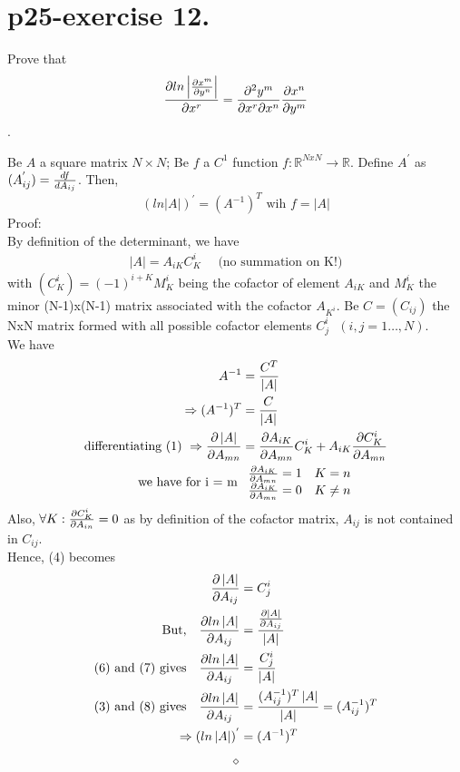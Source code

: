 \section{p25-exercise 12.}
\begin{tcolorbox}
Prove that $$\pdv{ln\left|\pdv{x^m}{y^n}\right|}{x^r} =\pdv{y^m}{x^r}{x^n}\pdv{x^n}{y^m}$$.
\end{tcolorbox}
\begin{lemma}
Be $A$ a square matrix $N\times N$; Be $f$ a $C^1$ function $f:\mathbb{R}^{NxN} \rightarrow \mathbb{R}$. Define $A^{'}$ as $(A^{'}_{ij}) = \dv{f}{A_{ij}}$. Then,$$(ln\left|A\right|)^{'} = (A^{-1})^T \text{ wih }  f =\left|A\right|$$
Proof:\\
By definition of the determinant, we have
\begin{align}
\left|A\right| = A_{iK}C_{K}^i \quad \text{ (no summation on K!)}
\end{align}
with $(C_{K}^i) =  (-1)^{i+K}M^{i}_K$ being the cofactor  of element $A_{iK}$ and $M^{i}_K$ the minor (N-1)x(N-1) matrix associated with the cofactor $A_{K^i}$. Be $C = (C_{ij})$ the NxN matrix formed with all possible cofactor elements  $C_{j}^i \text{  }(i,j = 1 \dots,N)$.\\
We have 
\begin{align}
\ A^{-1} &= \frac{C^T}{\left|A\right|}\\
\Rightarrow (A^{-1})^T &= \frac{C}{\left|A\right|} \\
\text{differentiating (1) }\Rightarrow \pdv{\left|A\right|}{A_{mn}} &= \pdv{A_{iK}}{A_{mn}}C^i_K +A_{iK} \pdv{C^i_K}{A_{mn}}\\
\text{we have for i = m } & \begin{array}{c}
    \pdv{A_{iK}}{A_{mn}} = 1\quad K=n\\
    \pdv{A_{iK}}{A_{mn}} = 0\quad K \neq n\\
  \end{array}
\end{align}
Also, $\forall K: \pdv{C^i_K}{A_{in}} = 0 $ as by definition of the cofactor matrix, $A_{ij} $ is not contained in $C_{ij} $.\\
Hence, (4) becomes
\begin{align}
\pdv{\left|A\right|}{A_{ij}} &= C^i_j\\
\text{But,}\quad \pdv{ln\left|A\right|}{A_{ij}} &= \frac{\pdv{\left|A\right|}{A_{ij}}}{\left|A\right|}\\
\text{(6) and  (7) gives}\quad \pdv{ln\left|A\right|}{A_{ij}} &= \frac{C^i_j}{\left|A\right|}\\
\text{(3) and  (8) gives}\quad \pdv{ln\left|A\right|}{A_{ij}} &= \frac{(A^{-1}_{ij})^T \left|A\right|}{\left|A\right|} = (A^{-1}_{ij})^T \\
\Rightarrow (ln\left|A\right|)^{'} &= (A^{-1})^T
\end{align}
\end{lemma}$$\diamond$$

